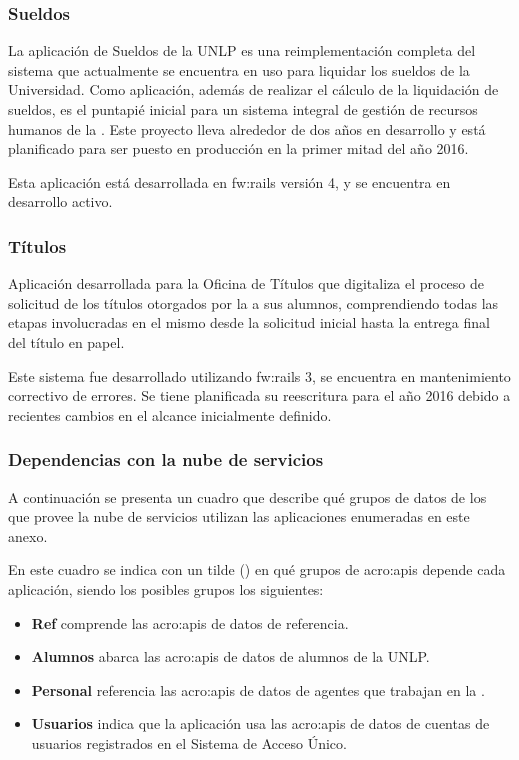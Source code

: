 \subsubsection{Sueldos}
\label{anexo:detalle-clientes:sueldos}

La aplicación de Sueldos de la UNLP es una reimplementación completa del sistema que actualmente se encuentra en uso para liquidar los sueldos de la Universidad. Como aplicación, además de realizar el cálculo de la liquidación de sueldos, es el puntapié inicial para un sistema integral de gestión de recursos humanos de la {\unlp}. Este proyecto lleva alrededor de dos años en desarrollo y está planificado para ser puesto en producción en la primer mitad del año 2016.

Esta aplicación está desarrollada en \gls{fw:rails} versión 4, y se encuentra en desarrollo activo.


\subsubsection{Títulos}
\label{anexo:detalle-clientes:titulos}

Aplicación desarrollada para la Oficina de Títulos que digitaliza el proceso de solicitud de los títulos otorgados por la {\unlp} a sus alumnos, comprendiendo todas las etapas involucradas en el mismo desde la solicitud inicial hasta la entrega final del título en papel.

Este sistema fue desarrollado utilizando \gls{fw:rails} 3, se encuentra en mantenimiento correctivo de errores. Se tiene planificada su reescritura para el año 2016 debido a recientes cambios en el alcance inicialmente definido.


\subsubsection{Dependencias con la nube de servicios}
\label{anexo:detalle-clientes:dependencias-nube}

A continuación se presenta un cuadro que describe qué grupos de datos de los que provee la nube de servicios utilizan las aplicaciones enumeradas en este anexo.

En este cuadro se indica con un tilde ({\checkmark}) en qué grupos de \glspl{acro:api} depende cada aplicación, siendo los posibles grupos los siguientes:

\begin{itemize}
  \item \textbf{Ref} comprende las \glspl{acro:api} de datos de referencia.
  \item \textbf{Alumnos} abarca las \glspl{acro:api} de datos de alumnos de la UNLP.
  \item \textbf{Personal} referencia las \glspl{acro:api} de datos de agentes que trabajan en la {\unlp}.
  \item \textbf{Usuarios} indica que la aplicación usa las \glspl{acro:api} de datos de cuentas de usuarios registrados en el Sistema de Acceso Único.
\end{itemize}

